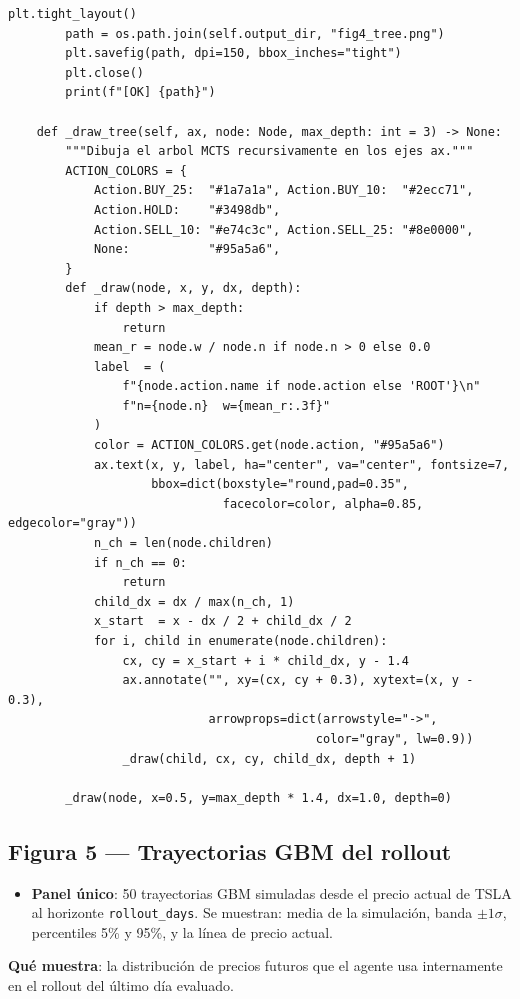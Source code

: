 \documentclass[12pt, a4paper]{article}
\begin{document}
\begin{lstlisting}[caption={Figura 4 -- arbol MCTS y analisis de convergencia}]
        plt.tight_layout()
        path = os.path.join(self.output_dir, "fig4_tree.png")
        plt.savefig(path, dpi=150, bbox_inches="tight")
        plt.close()
        print(f"[OK] {path}")

    def _draw_tree(self, ax, node: Node, max_depth: int = 3) -> None:
        """Dibuja el arbol MCTS recursivamente en los ejes ax."""
        ACTION_COLORS = {
            Action.BUY_25:  "#1a7a1a", Action.BUY_10:  "#2ecc71",
            Action.HOLD:    "#3498db",
            Action.SELL_10: "#e74c3c", Action.SELL_25: "#8e0000",
            None:           "#95a5a6",
        }
        def _draw(node, x, y, dx, depth):
            if depth > max_depth:
                return
            mean_r = node.w / node.n if node.n > 0 else 0.0
            label  = (
                f"{node.action.name if node.action else 'ROOT'}\n"
                f"n={node.n}  w={mean_r:.3f}"
            )
            color = ACTION_COLORS.get(node.action, "#95a5a6")
            ax.text(x, y, label, ha="center", va="center", fontsize=7,
                    bbox=dict(boxstyle="round,pad=0.35",
                              facecolor=color, alpha=0.85, edgecolor="gray"))
            n_ch = len(node.children)
            if n_ch == 0:
                return
            child_dx = dx / max(n_ch, 1)
            x_start  = x - dx / 2 + child_dx / 2
            for i, child in enumerate(node.children):
                cx, cy = x_start + i * child_dx, y - 1.4
                ax.annotate("", xy=(cx, cy + 0.3), xytext=(x, y - 0.3),
                            arrowprops=dict(arrowstyle="->",
                                           color="gray", lw=0.9))
                _draw(child, cx, cy, child_dx, depth + 1)

        _draw(node, x=0.5, y=max_depth * 1.4, dx=1.0, depth=0)
\end{lstlisting}

\subsection{Figura 5 --- Trayectorias GBM del rollout}

\begin{tcolorbox}[figura, title={Fig.\ 5: \texttt{fig5\_gbm\_paths.png}}]
\begin{itemize}\small
  \item \textbf{Panel único}: 50 trayectorias GBM simuladas desde el precio
        actual de TSLA al horizonte \texttt{rollout\_days}.
        Se muestran: media de la simulación, banda $\pm 1\sigma$,
        percentiles 5\% y 95\%, y la línea de precio actual.
\end{itemize}
\textbf{Qué muestra}: la distribución de precios futuros que el agente
usa internamente en el rollout del último día evaluado.
\end{tcolorbox}
\end{document}
